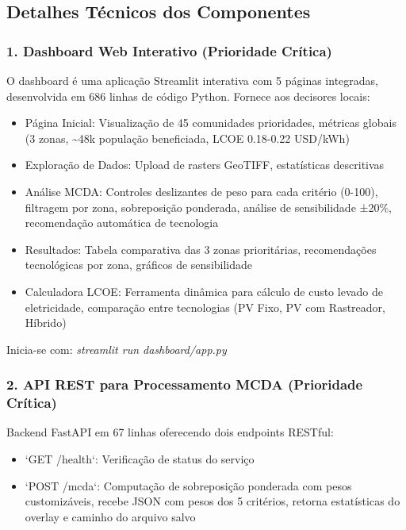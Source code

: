 \documentclass[12pt, a4paper]{article}
\begin{document}
\subsection{Detalhes Técnicos dos Componentes}

\subsubsection{1. Dashboard Web Interativo (Prioridade Crítica)}

O dashboard é uma aplicação Streamlit interativa com 5 páginas integradas, desenvolvida em 686 linhas de código Python. Fornece aos decisores locais:

\begin{itemize}
    \item Página Inicial: Visualização de 45 comunidades prioridades, métricas globais (3 zonas, \textasciitilde{}48k população beneficiada, LCOE 0.18-0.22 USD/kWh)
    \item Exploração de Dados: Upload de rasters GeoTIFF, estatísticas descritivas
    \item Análise MCDA: Controles deslizantes de peso para cada critério (0-100), filtragem por zona, sobreposição ponderada, análise de sensibilidade ±20\%, recomendação automática de tecnologia
    \item Resultados: Tabela comparativa das 3 zonas prioritárias, recomendações tecnológicas por zona, gráficos de sensibilidade
    \item Calculadora LCOE: Ferramenta dinâmica para cálculo de custo levado de eletricidade, comparação entre tecnologias (PV Fixo, PV com Rastreador, Híbrido)
\end{itemize}

Inicia-se com: \textit{streamlit run dashboard/app.py}

\subsubsection{2. API REST para Processamento MCDA (Prioridade Crítica)}

Backend FastAPI em 67 linhas oferecendo dois endpoints RESTful:

\begin{itemize}
    \item `GET /health`: Verificação de status do serviço
    \item `POST /mcda`: Computação de sobreposição ponderada com pesos customizáveis, recebe JSON com pesos dos 5 critérios, retorna estatísticas do overlay e caminho do arquivo salvo
\end{itemize}
\end{document}
